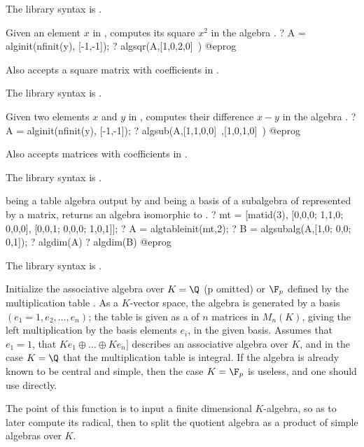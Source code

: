 The library syntax is .

\label{se:algsqr}
Given an element $x$ in , computes its square $x^2$ in the
algebra .
\bprog
? A = alginit(nfinit(y), [-1,-1]);
? algsqr(A,[1,0,2,0]~)
@eprog

Also accepts a square matrix with coefficients in .

The library syntax is .

\label{se:algsub}
Given two elements $x$ and $y$ in , computes their difference
$x-y$ in the algebra .
\bprog
? A = alginit(nfinit(y), [-1,-1]);
? algsub(A,[1,1,0,0]~,[1,0,1,0]~)
@eprog

Also accepts matrices with coefficients in .

The library syntax is .

\label{se:algsubalg}
 being a table algebra output by  and 
being a basis of a subalgebra of  represented by a matrix, returns an
algebra isomorphic to .
\bprog
? mt = [matid(3), [0,0,0; 1,1,0; 0,0,0], [0,0,1; 0,0,0; 1,0,1]];
? A = algtableinit(mt,2);
? B = algsubalg(A,[1,0; 0,0; 0,1]);
? algdim(A)
? algdim(B)
@eprog

The library syntax is .

\label{se:algtableinit}
Initialize the associative algebra over $K = \Q$ (p omitted) or $\F_p$
defined by the multiplication table .
As a $K$-vector space, the algebra is generated by a basis
$(e_1 = 1, e_2, \dots, e_n)$; the table is given as a  of $n$ matrices in
$M_n(K)$, giving the left multiplication by the basis elements $e_i$, in the
given basis.
Assumes that $e_1=1$, that $K e_1\oplus \dots\oplus K e_n]$ describes an
associative algebra over $K$, and in the case $K=\Q$ that the multiplication
table is integral. If the algebra is already known to be central
and simple, then the case $K = \F_p$ is useless, and one should use
 directly.

The point of this function is to input a finite dimensional $K$-algebra, so
as to later compute its radical, then to split the quotient algebra as a
product of simple algebras over $K$.

